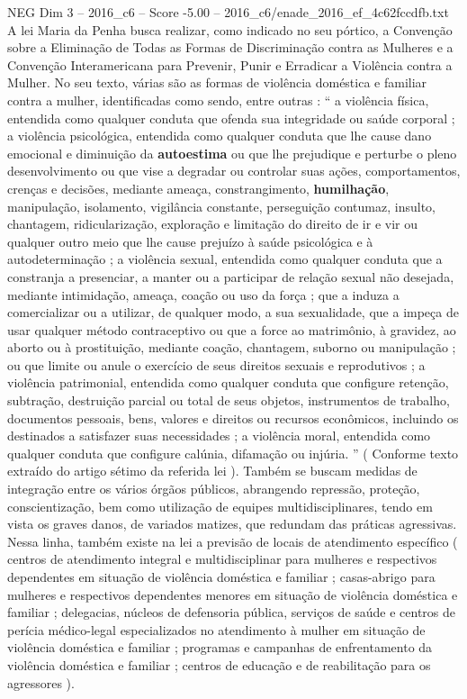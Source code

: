 \begin{textsample}{NEG Dim 3 – 2016\_c6 – Score -5.00 – 2016\_c6/enade\_2016\_ef\_4c62fccdfb.txt}
A lei Maria da Penha busca realizar, como indicado no seu pórtico, a Convenção sobre a Eliminação de Todas as Formas de Discriminação contra as Mulheres e a Convenção Interamericana para Prevenir, Punir e Erradicar a Violência contra a Mulher.
No seu texto, várias são as formas de violência doméstica e familiar contra a mulher, identificadas como sendo, entre outras : “ a violência física, entendida como qualquer conduta que ofenda sua integridade ou saúde corporal ; a violência psicológica, entendida como qualquer conduta que lhe cause dano emocional e diminuição da \textbf{autoestima} ou que lhe prejudique e perturbe o pleno desenvolvimento ou que vise a degradar ou controlar suas ações, comportamentos, crenças e decisões, mediante ameaça, constrangimento, \textbf{humilhação}, manipulação, isolamento, vigilância constante, perseguição contumaz, insulto, chantagem, ridicularização, exploração e limitação do direito de ir e vir ou qualquer outro meio que lhe cause prejuízo à saúde psicológica e à autodeterminação ; a violência sexual, entendida como qualquer conduta que a constranja a presenciar, a manter ou a participar de relação sexual não desejada, mediante intimidação, ameaça, coação ou uso da força ; que a induza a comercializar ou a utilizar, de qualquer modo, a sua sexualidade, que a impeça de usar qualquer método contraceptivo ou que a force ao matrimônio, à gravidez, ao aborto ou à prostituição, mediante coação, chantagem, suborno ou manipulação ; ou que limite ou anule o exercício de seus direitos sexuais e reprodutivos ; a violência patrimonial, entendida como qualquer conduta que configure retenção, subtração, destruição parcial ou total de seus objetos, instrumentos de trabalho, documentos pessoais, bens, valores e direitos ou recursos econômicos, incluindo os destinados a satisfazer suas necessidades ; a violência moral, entendida como qualquer conduta que configure calúnia, difamação ou injúria. ” ( Conforme texto extraído do artigo sétimo da referida lei ).
Também se buscam medidas de integração entre os vários órgãos públicos, abrangendo repressão, proteção, conscientização, bem como utilização de equipes multidisciplinares, tendo em vista os graves danos, de variados matizes, que redundam das práticas agressivas.
Nessa linha, também existe na lei a previsão de locais de atendimento específico ( centros de atendimento integral e multidisciplinar para mulheres e respectivos dependentes em situação de violência doméstica e familiar ; casas-abrigo para mulheres e respectivos dependentes menores em situação de violência doméstica e familiar ; delegacias, núcleos de defensoria pública, serviços de saúde e centros de perícia médico-legal especializados no atendimento à mulher em situação de violência doméstica e familiar ; programas e campanhas de enfrentamento da violência doméstica e familiar ; centros de educação e de reabilitação para os agressores ).

\end{textsample}
